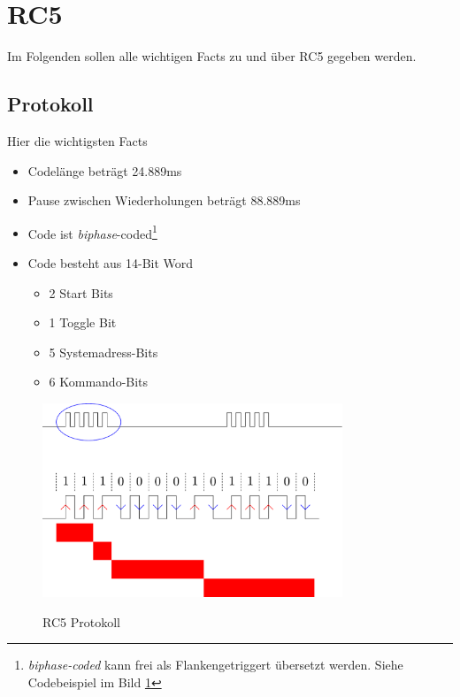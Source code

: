 



\section{RC5}
Im Folgenden sollen alle wichtigen Facts zu und über RC5 gegeben werden.

\subsection{Protokoll}
Hier die wichtigsten Facts 
\begin{itemize}
    \item Codelänge beträgt 24.889ms
    \item Pause zwischen Wiederholungen beträgt 88.889ms
    \item Code ist \emph{biphase}-coded\footnote{
        \emph{biphase-coded} kann frei als Flankengetriggert übersetzt
        werden. Siehe Codebeispiel im Bild \ref{pic:rc5_simple} }
    \item Code besteht aus 14-Bit Word
    \begin{itemize}
        \item 2 Start Bits
        \item 1 Toggle Bit
        \item 5 Systemadress-Bits
        \item 6 Kommando-Bits
    \end{itemize}
\end{itemize}

\begin{figure}[h!]
    \centering
    \includegraphics[width=0.8\textwidth]{rc5_simple.pdf}
    \label{pic:rc5_simple}
    \caption{RC5 Protokoll}
\end{figure}

